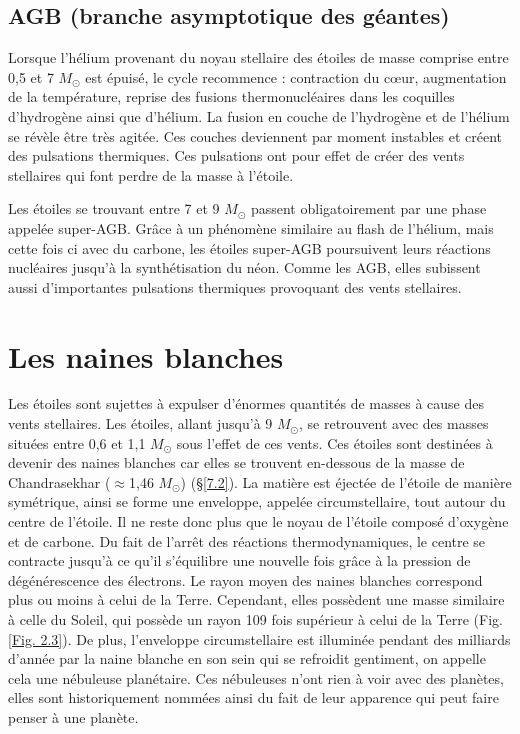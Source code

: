 \subsection{AGB (branche asymptotique des géantes)}\label{2.2.2}

Lorsque l'hélium provenant du noyau stellaire des étoiles de masse comprise entre 0,5 et 7 $M_\odot$ est épuisé, le cycle recommence : contraction du cœur, augmentation de la température, reprise des fusions thermonucléaires dans les coquilles d’hydrogène ainsi que d’hélium. La fusion en couche de l’hydrogène et de l’hélium se révèle être très agitée. Ces couches deviennent par moment instables et créent des pulsations thermiques. Ces pulsations ont pour effet de créer des vents stellaires qui font perdre de la masse à l’étoile.\smallskip

Les étoiles se trouvant entre 7 et 9 $M_\odot$ passent obligatoirement par une phase appelée super-AGB. Grâce à un phénomène similaire au flash de l'hélium, mais cette fois ci avec du carbone, les étoiles super-AGB poursuivent leurs réactions nucléaires jusqu'à la synthétisation du néon. Comme les AGB, elles subissent aussi d'importantes pulsations thermiques provoquant des vents stellaires.

\section{Les naines blanches}\label{2.3}

Les étoiles sont sujettes à expulser d’énormes quantités de masses à cause des vents stellaires. Les étoiles, allant jusqu’à 9 $M_\odot$, se retrouvent avec des masses situées entre 0,6 et 1,1 $M_\odot$ sous l’effet de ces vents. Ces étoiles sont destinées à devenir des naines blanches car elles se trouvent en-dessous de la masse de Chandrasekhar ($\approx$1,46 $M_\odot$) (§\ref{7.2}). La matière est éjectée de l’étoile de manière symétrique, ainsi se forme une enveloppe, appelée circumstellaire, tout autour du centre de l’étoile. Il ne reste donc plus que le noyau de l’étoile composé d’oxygène et de carbone. Du fait de l’arrêt des réactions thermodynamiques, le centre se contracte jusqu’à ce qu’il s’équilibre une nouvelle fois grâce à la pression de dégénérescence des électrons. Le rayon moyen des naines blanches correspond plus ou moins à celui de la Terre. Cependant, elles possèdent une masse similaire à celle du Soleil, qui possède un rayon 109 fois supérieur à celui de la Terre (Fig. \ref{Fig. 2.3}). De plus, l’enveloppe circumstellaire est illuminée pendant des milliards d’année par la naine blanche en son sein qui se refroidit gentiment, on appelle cela une nébuleuse planétaire. Ces nébuleuses n’ont rien à voir avec des planètes, elles sont historiquement nommées ainsi du fait de leur apparence qui peut faire penser à une planète.\newpage 

